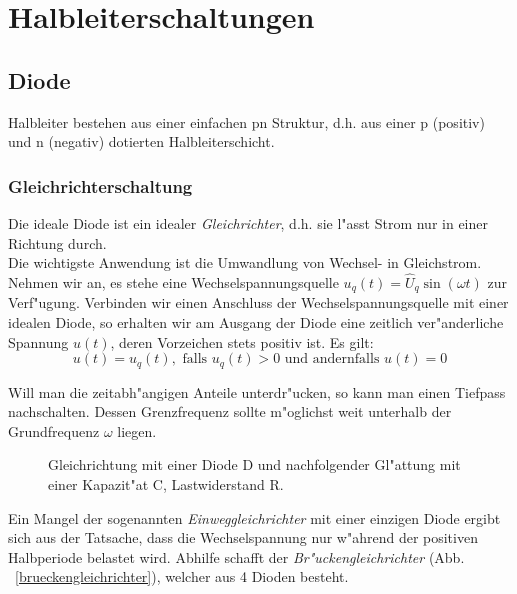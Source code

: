 \documentclass[german, 10pt, a4paper, headsepline]{scrreprt}
\theoremstyle{remark}
\begin{document}
\chapter{Halbleiterschaltungen}

\section{Diode}

Halbleiter bestehen aus einer einfachen pn Struktur, d.h. aus einer p (positiv) und n (negativ) dotierten Halbleiterschicht.

\subsection{Gleichrichterschaltung}

Die ideale Diode ist ein idealer \textit{Gleichrichter}, d.h. sie l"asst Strom nur in einer Richtung durch.\\

Die wichtigste Anwendung ist die Umwandlung von Wechsel- in Gleichstrom. Nehmen wir an, es stehe eine Wechselspannungsquelle $u_q(t) = \hat{U}_q\sin(\omega t)$ zur Verf"ugung. Ver\-binden wir einen Anschluss der Wechselspannungsquelle mit einer idealen Diode, so erhalten wir am Ausgang der Diode eine zeitlich ver"anderliche Spannung $u(t)$, deren Vorzeichen stets positiv ist. Es gilt:
\begin{displaymath}
	u(t) = u_q(t), \mbox{ falls } u_q(t) > 0 \mbox{ und andernfalls } u(t) = 0
\end{displaymath}

Will man die zeitabh"angigen Anteile unterdr"ucken, so kann man einen Tiefpass nachschalten. Dessen Grenzfrequenz sollte m"oglichst weit unterhalb der Grundfrequenz $\omega$ liegen.

\begin{figure}[hbt]
 
 \centerline{\box\graph}
 \caption{Gleichrichtung mit einer Diode D und nachfolgender Gl"attung mit einer Kapazit"at C, Lastwiderstand R.}
 \label{einweggleichrichter}
\end{figure}

Ein Mangel der sogenannten \textit{Einweggleichrichter} mit einer einzigen Diode ergibt sich aus der Tatsache, dass die Wechselspannung nur w"ahrend der positiven Halbperiode belastet wird. Abhilfe schafft der \textit{Br"uckengleichrichter}  (Abb. ~\ref{brueckengleichrichter}), welcher aus 4 Dioden besteht.
\end{document}
